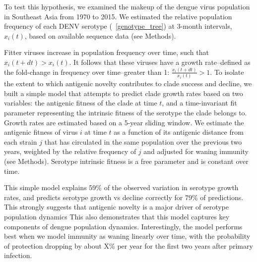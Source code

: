 \documentclass[11pt,oneside,letterpaper]{article}
\begin{document}
To test this hypothesis, we examined the makeup of the dengue virus population in Southeast Asia from 1970 to 2015.
We estimated the relative population frequency of each DENV serotype (~\ref{genotype_tree}) at 3-month intervals, $x_i(t)$, based on available sequence data (see Methods).

Fitter viruses increase in population frequency over time, such that $x_i(t+dt) > x_i(t)$.
It follows that these viruses have a growth rate--defined as the fold-change in frequency over time--greater than 1: $\frac{x_i(t+dt)}{x_i(t)} > 1$.
To isolate the extent to which antigenic novelty contributes to clade success and decline, we built a simple model that attempts to predict clade growth rates based on two variables: the antigenic fitness of the clade at time $t$, and a time-invariant fit parameter representing the intrinsic fitness of the serotype the clade belongs to.
Growth rates are estimated based on a 5-year sliding window.
We estimate the antigenic fitness of virus $i$ at time $t$ as a function of its antigenic distance from each strain $j$ that has circulated in the same population over the previous two years, weighted by the relative frequency of $j$ and adjusted for waning immunity (see Methods).
Serotype intrinsic fitness is a free parameter and is constant over time.

This simple model explains 59\% of the observed variation in serotype growth rates, and predicts serotype growth vs decline correctly for 79\% of predictions.
This strongly suggests that antigenic novelty is a major driver of serotype population dynamics %
This also demonstrates that this model captures key components of dengue population dynamics.
Interestingly, the model performs best when we model immunity as waning linearly over time, with the probability of protection dropping by about X\% per year for the first two years after primary infection. %
\end{document}
